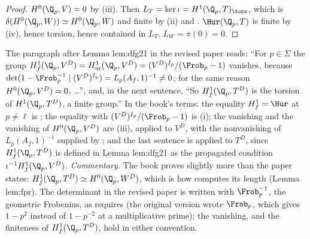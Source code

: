 \begin{proof}
$H^0(\Q_p,V)=0$ by (iii). Then $L_T=\ker\iota=H^1(\Q_p,T)_{\tors}$, which is $\delta(H^0(\Q_p,W))\simeq H^0(\Q_p,W)$ and finite by
(ii) and . $\Hur(\Q_p,T)$ is finite by (iv), hence torsion, hence contained in
$L_T$. $L_W=\pi(0)=0$.
\end{proof}

\begin{paperlink}\label{pl:galcoh:after-dfg21}
The paragraph after Lemma lem:dfg21 in the revised paper reads: ``For $p\in\Sigma$ the group $H^1_f(\Q_p,V^D)=H^1_{\mathrm{ur}}(\Q_p,V^D)=(V^D)^{I_p}/(\Frob_p-1)$
vanishes, because $\det(1-\Frob_p^{-1}\mid(V^D)^{I_p})=L_p(A_f,1)^{-1}\ne0$; for the same reason $H^0(\Q_p,V^D)=0$, \dots'', and, in the next sentence, ``So
$H^1_f(\Q_p,T^D)$ is the torsion of $H^1(\Q_p,T^D)$, a finite group.'' In the book's terms: the equality $H^1_f=\Hur$ at $p\ne\ell$ is ; the
equality with $(V^D)^{I_p}/(\Frob_p-1)$ is (i); the vanishing and the vanishing of $H^0(\Q_p,V^D)$ are
(iii), applied to $V^D$, with the nonvanishing of $L_p(A_f,1)^{-1}$ supplied by ; and the last sentence is
 applied to $T^D$, since $H^1_f(\Q_p,T^D)$ is defined in Lemma lem:dfg21 as the propagated condition $\iota^{-1}H^1_f(\Q_p,V^D)$.
\emph{Commentary.} The book proves slightly more than the paper states: $H^1_f(\Q_p,T^D)\simeq H^0(\Q_p,W^D)$, which is how  computes its length
(Lemma lem:fpr). The determinant in the revised paper is written with $\Frob_p^{-1}$, the geometric Frobenius, as  requires (the
original version wrote $\Frob_p$, which gives $1-p^2$ instead of $1-p^{-2}$ at a multiplicative prime); the vanishing, and the finiteness of $H^1_f(\Q_p,T^D)$,
hold in either convention.
\end{paperlink}

